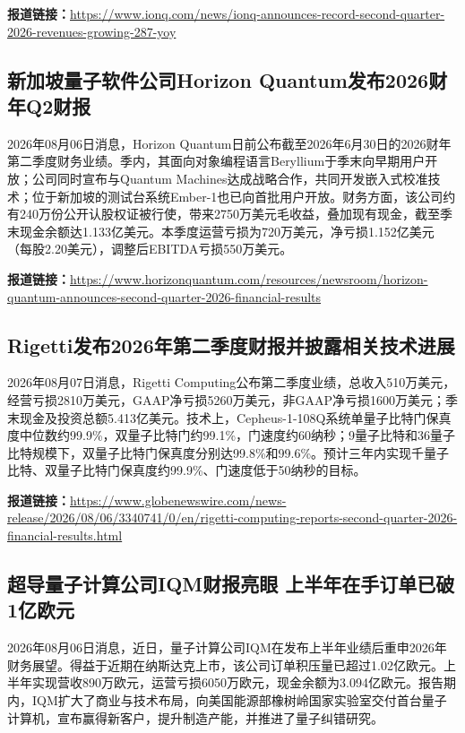 \documentclass[12pt,a4paper]{ctexart}
\begin{document}
\noindent\textbf{报道链接：}\url{https://www.ionq.com/news/ionq-announces-record-second-quarter-2026-revenues-growing-287-yoy}

\subsection{ 新加坡量子软件公司Horizon Quantum发布2026财年Q2财报 }

2026年08月06日消息，Horizon Quantum日前公布截至2026年6月30日的2026财年第二季度财务业绩。季内，其面向对象编程语言Beryllium于季末向早期用户开放；公司同时宣布与Quantum Machines达成战略合作，共同开发嵌入式校准技术；位于新加坡的测试台系统Ember-1也已向首批用户开放。财务方面，该公司约有240万份公开认股权证被行使，带来2750万美元毛收益，叠加现有现金，截至季末现金余额达1.133亿美元。本季度运营亏损为720万美元，净亏损1.152亿美元（每股2.20美元），调整后EBITDA亏损550万美元。

\noindent\textbf{报道链接：}\url{https://www.horizonquantum.com/resources/newsroom/horizon-quantum-announces-second-quarter-2026-financial-results}

\subsection{ Rigetti发布2026年第二季度财报并披露相关技术进展 }

2026年08月07日消息，Rigetti Computing公布第二季度业绩，总收入510万美元，经营亏损2810万美元，GAAP净亏损5260万美元，非GAAP净亏损1600万美元；季末现金及投资总额5.413亿美元。技术上，Cepheus-1-108Q系统单量子比特门保真度中位数约99.9\%，双量子比特门约99.1\%，门速度约60纳秒；9量子比特和36量子比特规模下，双量子比特门保真度分别达99.8\%和99.6\%。预计三年内实现千量子比特、双量子比特门保真度约99.9\%、门速度低于50纳秒的目标。

\noindent\textbf{报道链接：}\url{https://www.globenewswire.com/news-release/2026/08/06/3340741/0/en/rigetti-computing-reports-second-quarter-2026-financial-results.html}

\subsection{ 超导量子计算公司IQM财报亮眼 上半年在手订单已破1亿欧元 }

2026年08月06日消息，近日，量子计算公司IQM在发布上半年业绩后重申2026年财务展望。得益于近期在纳斯达克上市，该公司订单积压量已超过1.02亿欧元。上半年实现营收890万欧元，运营亏损6050万欧元，现金余额为3.094亿欧元。报告期内，IQM扩大了商业与技术布局，向美国能源部橡树岭国家实验室交付首台量子计算机，宣布赢得新客户，提升制造产能，并推进了量子纠错研究。
\end{document}
